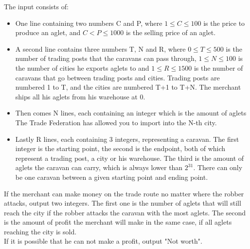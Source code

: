 \begin{Input}
    The input consists of:
       \begin{itemize}
            \item One line containing two numbers C and P, where $1 \leq C \leq 100$ is the price to produce an aglet, and $C < P \leq 1000$ is the selling price of an aglet.
            \item A second line contains three numbers T, N and R, where $0 \leq T \leq 500$ is the number of trading posts that the caravans can pass through, $1 \leq N \leq 100$ is the number of cities he exports aglets to and $1 \leq R \leq 1500$ is the number of caravans that go between trading posts and cities. Trading posts are numbered 1 to T, and the cities are numbered T+1 to T+N. The merchant ships all his aglets from his warehouse at 0.
            \item Then comes N lines, each containing an integer which is the amount of aglets The Trade Federation has allowed you to import into the N-th city.
            \item Lastly R lines, each containing 3 integers, representing a caravan. The first integer is the starting point, the second is the endpoint, both of which represent a trading post, a city or his warehouse. The third is the amount of aglets the caravan can carry, which is always lower than $2^{31}$. There can only be one caravan between a given starting point and ending point.
        \end{itemize}
\end{Input}

\begin{Output}
    If the merchant can make money on the trade route no matter where the robber attacks, output two integers.
    The first one is the number of aglets that will still reach the city if the robber attacks the caravan
    with the most aglets. The second is the amount of profit the merchant will make in the same case, if all
    aglets reaching the city is sold.\\
    If it is possible that he can not make a profit, output "Not worth".
\end{Output}
